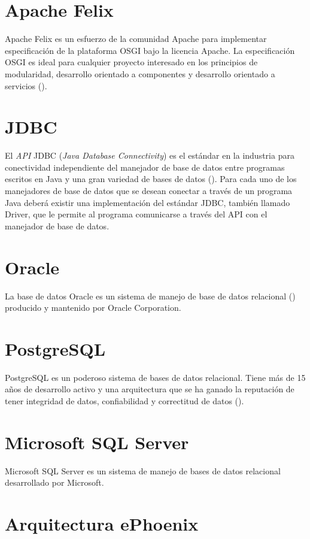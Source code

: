 \section{Apache Felix}

Apache Felix es un esfuerzo de la comunidad Apache para implementar especificación de
la plataforma OSGI bajo la licencia Apache. La especificación OSGI es ideal para
cualquier proyecto interesado en los principios de modularidad, desarrollo orientado
a componentes y desarrollo orientado a servicios (\cite{FELIX}).

\section{JDBC}

El \emph{API} JDBC (\emph{Java Database Connectivity}) es el estándar en la industria
para conectividad independiente del manejador de base de datos entre programas escritos en
Java y una gran variedad de bases de datos (\cite{JDBC}). Para cada uno de los manejadores
de base de datos que se desean conectar a través de un programa Java deberá existir una implementación
del estándar JDBC, también llamado Driver, que le permite al programa comunicarse a través del
API con el manejador de base de datos.

\section{Oracle}

La base de datos Oracle es un sistema de manejo de base de datos relacional (\cite{ORACLE})
producido y mantenido por Oracle Corporation.

\section{PostgreSQL}

PostgreSQL es un poderoso sistema de bases de datos relacional. Tiene más de
15 años de desarrollo activo y una arquitectura que se ha ganado la reputación de tener
integridad de datos, confiabilidad y correctitud de datos (\cite{POSTGRE}).

\section{Microsoft SQL Server}
Microsoft SQL Server es un sistema de manejo de bases de datos relacional desarrollado por
Microsoft.

\section{Arquitectura ePhoenix}

